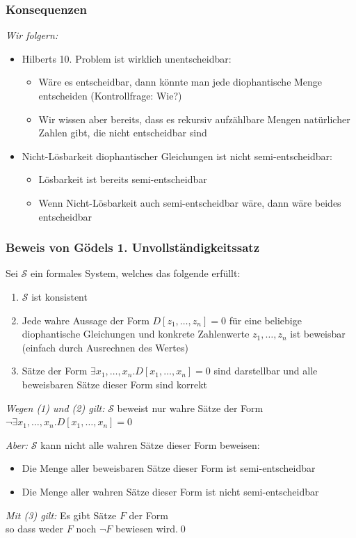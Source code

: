 \documentclass[onlymath]{beamer}
\begin{document}
\begin{frame}\frametitle{Konsequenzen}

\emph{Wir folgern:}
\begin{itemize}
\item \alert{Hilberts 10. Problem ist wirklich unentscheidbar:}
\begin{itemize}
\item Wäre es entscheidbar, dann könnte man jede diophantische Menge entscheiden (Kontrollfrage: Wie?)
\item Wir wissen aber bereits, dass es rekursiv aufzählbare Mengen natürlicher Zahlen gibt, die nicht entscheidbar sind
\end{itemize}\pause
\item \alert{Nicht-Lösbarkeit diophantischer Gleichungen ist nicht semi-entscheidbar:}
\begin{itemize}
\item Lösbarkeit ist bereits semi-entscheidbar
\item Wenn Nicht-Lösbarkeit auch semi-entscheidbar wäre, dann wäre beides entscheidbar
\end{itemize}
\end{itemize}

\end{frame}

\begin{frame}\frametitle{Beweis von Gödels 1. Unvollständigkeitssatz}

Sei $\mathcal{S}$ ein formales System, welches das folgende erfüllt:
\begin{enumerate}[(1)]
\item $\mathcal{S}$ ist konsistent
\item Jede wahre Aussage der Form $D[z_1,\ldots,z_n]= 0$ für eine beliebige diophantische Gleichungen und \alert{konkrete} Zahlenwerte $z_1,\ldots, z_n$ ist beweisbar {\tiny(einfach durch Ausrechnen des Wertes)}
\item Sätze der Form $\exists x_1,\ldots, x_n.D[x_1,\ldots,x_n]= 0$ sind darstellbar und alle beweisbaren Sätze dieser Form sind korrekt
\end{enumerate}\pause
\emph{Wegen (1) und (2) gilt:} $\mathcal{S}$ beweist nur wahre Sätze der Form $\neg\exists x_1,\ldots, x_n.D[x_1,\ldots,x_n]= 0$\medskip\pause

\emph{Aber:} $\mathcal{S}$ kann nicht alle wahren Sätze dieser Form beweisen:
\begin{itemize}
\item Die Menge aller beweisbaren Sätze dieser Form ist semi-entscheidbar
\item Die Menge aller wahren Sätze dieser Form ist nicht semi-entscheidbar
\end{itemize}\pause
\emph{Mit (3) gilt:} Es gibt Sätze $F$ der Form \\ so dass weder $F$ noch $\neg F$ bewiesen wird.\qed

\end{frame}
\end{document}
